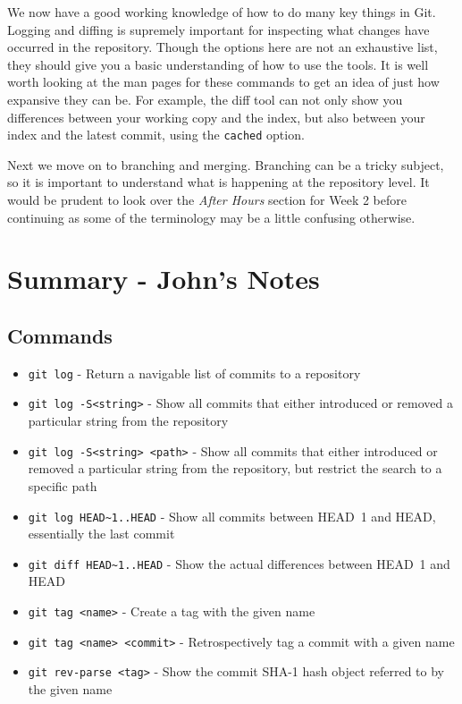 We now have a good working knowledge of how to do many key things in Git.  Logging and diffing is supremely important for inspecting what changes have occurred in the repository.  Though the options here are not an exhaustive list, they should give you a basic understanding of how to use the tools.  It is well worth looking at the man pages for these commands to get an idea of just how expansive they can be.  For example, the diff tool can not only show you differences between your working copy and the index, but also between your index and the latest commit, using the \texttt{cached} option.

Next we move on to branching and merging.  Branching can be a tricky subject, so it is important to understand what is happening at the repository level.  It would be prudent to look over the \emph{After Hours} section for Week 2 before continuing as some of the terminology may be a little confusing otherwise.

\clearpage

\section{Summary - John's Notes}
\subsection{Commands}
\begin{itemize}
\item\texttt{git log} - Return a navigable list of commits to a repository

\item\texttt{git log -S<string>} - Show all commits that either introduced or removed a particular string from the repository

\item\texttt{git log -S<string> <path>} - Show all commits that either introduced or removed a particular string from the repository, but restrict the search to a specific path

\item\texttt{git log HEAD\textasciitilde1..HEAD} - Show all commits between HEAD~1 and HEAD, essentially the last commit

\item\texttt{git diff HEAD\textasciitilde1..HEAD} - Show the actual differences between HEAD~1 and HEAD

\item\texttt{git tag <name>} - Create a tag with the given name

\item\texttt{git tag <name> <commit>} - Retrospectively tag a commit with a given name

\item\texttt{git rev-parse <tag>} - Show the commit SHA-1 hash object referred to by the given name
\end{itemize}

